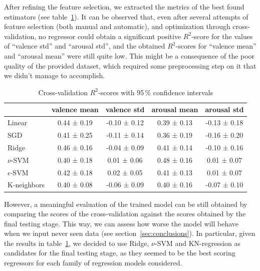 After refining the feature selection, we extracted the metrics of the best found estimators (see table~\ref{table:cross-scores}). It can be observed that, even after several attempts of feature selection (both manual and automatic), and optimization through cross-validation, no regressor could obtain a significant positive $R^2$-score for the values of ``valence std'' and ``arousal std'', and the obtained $R^2$-scores for ``valence mean'' and ``arousal mean'' were still quite low. This might be a consequence of the poor quality of the provided dataset, which required some preprocessing step on it that we didn't manage to accomplish.

\begin{table}
	\centering
	\begin{tabular}{lcccc}
		\toprule
		& valence mean & valence std & arousal mean & arousal std \\
		\midrule

		Linear & 0.44 ± 0.19 & -0.10 ± 0.12 & 0.39 ± 0.13 & -0.13 ± 0.18 \\
		SGD & 0.41 ± 0.25 & -0.11 ± 0.14 & 0.36 ± 0.19 & -0.16 ± 0.20 \\
		Ridge & 0.46 ± 0.16 & -0.04 ± 0.09 & 0.41 ± 0.14 & -0.10 ± 0.16 \\

		$\nu$-SVM & 0.40 ± 0.18 & 0.01 ± 0.06 & 0.48 ± 0.16 & 0.01 ± 0.07 \\
		$\epsilon$-SVM & 0.42 ± 0.18 & 0.02 ± 0.05 & 0.41 ± 0.13 & 0.01 ± 0.07 \\

		K-neighbors & 0.40 ± 0.08 & -0.06 ± 0.09 & 0.40 ± 0.16 & -0.07 ± 0.10 \\
		\bottomrule
	\end{tabular}
	\caption{Cross-validation $R^2$-scores with 95\,\% confidence intervals}
	\label{table:cross-scores}
\end{table}

However, a meaningful evaluation of the trained model can be still obtained by comparing the scores of the cross-validation against the scores obtained by the final testing stage.
This way, we can assess how worse the model will behave when we input never seen data (see section~\ref{sec:conclusions}).
In particular, given the results in table~\ref{table:cross-scores}, we decided to use Ridge, $\nu$-SVM and KN-regression as candidates for the final testing stage, as they seemed to be the best scoring regressors for each family of regression models considered. 
